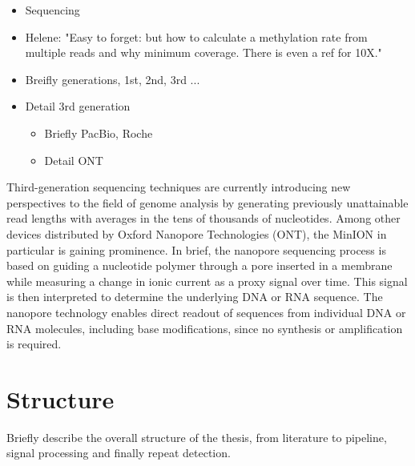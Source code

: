 \begin{itemize}
    \item Sequencing
    \item Helene: "Easy to forget: but how to calculate a methylation rate from multiple reads and why minimum coverage. There is even a ref for 10X."
    \item Breifly generations, 1st, 2nd, 3rd ...
    \item Detail 3rd generation
    \begin{itemize}
        \item Briefly PacBio, Roche
        \item Detail ONT
    \end{itemize}
\end{itemize}

Third-generation sequencing techniques are currently introducing new perspectives to the field of genome analysis by generating previously unattainable read lengths with averages in the tens of thousands of nucleotides. Among other devices distributed by Oxford Nanopore Technologies (ONT), the MinION in particular is gaining prominence. In brief, the nanopore sequencing process is based on guiding a nucleotide polymer through a pore inserted in a membrane while measuring a change in ionic current as a proxy signal over time. This signal is then interpreted to determine the underlying DNA or RNA sequence. The nanopore technology enables direct readout of sequences from individual DNA or RNA molecules, including base modifications, since no synthesis or amplification is required.

\section{Structure}
\label{sec:intro:structure}

Briefly describe the overall structure of the thesis, from literature to pipeline, signal processing and finally repeat detection.


